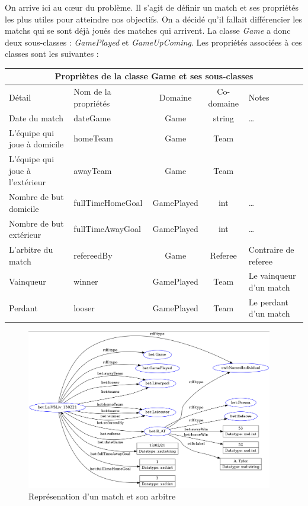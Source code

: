 \documentclass[oneside,13pt,a4paper]{article}
\begin{document}
On arrive ici au cœur du problème. Il s’agit de définir un match et ses propriétés les plus utiles pour atteindre nos objectifs. On a décidé qu’il fallait différencier les matchs qui se sont déjà joués des matches qui arrivent. La classe \textit{Game} a donc deux sous-classes : \textit{GamePlayed} et \textit{GameUpComing}. Les propriétés associées à ces classes sont les suivantes :

\begin{tabular}{| l | l | c | c | p{3cm} |}
  \hline
  \multicolumn{5}{|c|}{Propriètes de la classe \textbf{Game} et ses sous-classes} \\ \hline
  Détail & Nom de la propriétés & Domaine & Co-domaine & Notes \\ \hline
  Date du match & dateGame & Game & string & … \\ \hline
  L'équipe qui joue à domicile & homeTeam  & Game & Team& \\ \hline
  L'équipe qui joue à l'extérieur & awayTeam & Game & Team& \\ \hline 
  Nombre de but domicile& fullTimeHomeGoal & GamePlayed & int & … \\ \hline
  Nombre de but extérieur& fullTimeAwayGoal & GamePlayed & int& … \\ \hline
  L'arbitre du match & refereedBy & Game & Referee & Contraire de referee \\ \hline
  Vainqueur & winner & GamePlayed & Team & Le vainqueur d'un match \\ \hline
  Perdant & looser & GamePlayed & Team & Le perdant d'un match \\
  \hline
\end{tabular}

\begin{figure}[!h]
  \centering
  \includegraphics[width=0.96\textwidth]{img/game.png}
  \caption{Représenation d'un match et son arbitre}
\end{figure}
\end{document}
